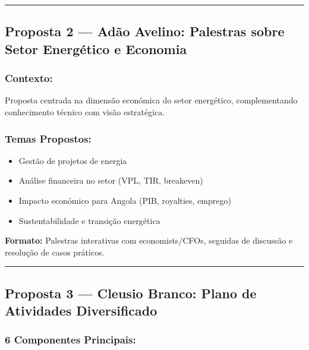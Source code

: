 \documentclass[12pt,a4paper]{article}
\begin{document}
\textcolor{spe-secondary}{\hspace{0.5cm}\rule{0.4\linewidth}{0.8pt}}

\subsection{Proposta 2 — Adão Avelino: Palestras sobre Setor Energético e Economia}

\subsubsection*{Contexto:}
Proposta centrada na dimensão económica do setor energético, complementando conhecimento técnico com visão estratégica.

\subsubsection*{Temas Propostos:}
\begin{itemize}[itemsep=0.15cm]
    \item Gestão de projetos de energia
    \item Análise financeira no setor (VPL, TIR, breakeven)
    \item Impacto económico para Angola (PIB, royalties, emprego)
    \item Sustentabilidade e transição energética
\end{itemize}

\textbf{Formato:} Palestras interativas com economists/CFOs, seguidas de discussão e resolução de casos práticos.

\textcolor{spe-secondary}{\hspace{0.5cm}\rule{0.4\linewidth}{0.8pt}}

\subsection{Proposta 3 — Cleusio Branco: Plano de Atividades Diversificado}

\subsubsection*{6 Componentes Principais:}
\end{document}
